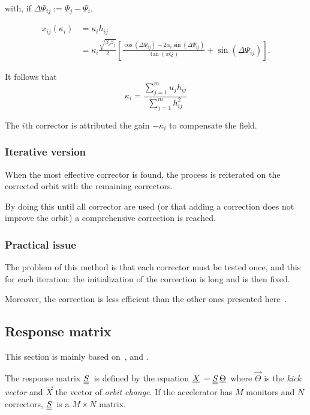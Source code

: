 with, if $\Delta \Psi_{ij} := \Psi_j-\Psi_i$,

\begin{align}
    \label{eq:hij}
    x_{ij}(\kappa_i) &= \kappa_i h_{ij} \nonumber\\
                     &= \kappa_i \frac{\sqrt{\beta_i \beta_j}}{2}
                         \left[
                             \frac{\cos(\Delta \Psi_{ij}) - 2\alpha_i \sin(\Delta\Psi_{ij})}
                                  {\tan (\pi Q)} + \sin (\Delta\Psi_{ij})
                         \right].
\end{align}

It follows that 
\begin{equation}
    \kappa_i = \frac{\sum\limits_{j=1}^m u_j h_{ij}}{\sum\limits_{j=1}^m h_{ij}^2}
\end{equation}

The $i$th corrector is attributed the gain $-\kappa_i$ to compensate the field.

\subsubsection{Iterative version}
When the most effective corrector is found, the process is reiterated on the corrected orbit with the remaining correctors. 

By doing this until all corrector are used (or that adding a correction does not improve the orbit) a comprehensive correction is reached.

\subsubsection{Practical issue}
The problem of this method is that each corrector must be tested once, and this for each iteration: the initialization of the correction is long and is then fixed.

Moreover, the correction is less efficient than the other ones presented here~\cite{book:wille}.

\subsection{Response matrix}
\label{ssec:response_matrix}

This section is mainly based on~\cite{book:wille}, \cite{art:decker-1991} and \cite{art:plouviez-1999}.

The response matrix $\underline{\underline{S}}\,$ is defined by the equation $\underline{X}\, = \underline{\underline{S}}\, \underline{\Theta}\,$ where $\vec{\Theta}$ is the \emph{kick vector} and $\vec{X}$ the vector of \emph{orbit change}. If the accelerator has $M$ monitors and $N$ correctors, $\underline{\underline{S}}\,$ is a $M \times N$ matrix.

